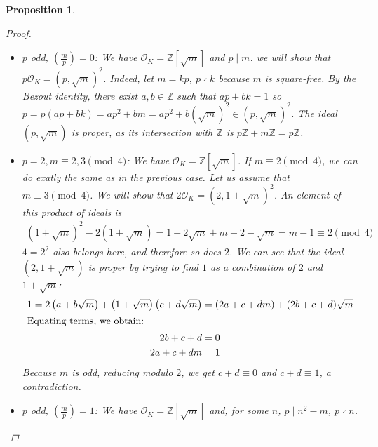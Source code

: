 \documentclass[11pt]{article}
\newtheorem{prop}{Proposition}
\theoremstyle{definition}
\begin{document}
\begin{prop}
\begin{proof}
            \begin{itemize}
                \item $p$ odd, $\left( \frac{m}{p} \right) = 0$: We have $\mathcal{O}_K = \mathbb{Z}\left[\sqrt {m}\right]$ and $p \mid m$.
                we will show that $p\mathcal{O}_K = \left(p, \sqrt {m}\right)^2$.
                Indeed, let $m = kp$, $p \nmid k$ because $m$ is square-free.
                By the Bezout identity, there exist $a, b \in \mathbb{Z}$ such that $ap + bk = 1$ so
                $p = p(ap+bk) = ap^2 + bm = ap^2 + b\left(\sqrt {m}\right)^2 \in \left(p, \sqrt {m}\right)^2$.
                The ideal $\left(p, \sqrt {m}\right)$ is proper,
                as its intersection with $\mathbb{Z}$ is $p\mathbb{Z} + m\mathbb{Z} = p\mathbb{Z}$.

                \item $p=2, m \equiv 2, 3 \pmod 4$:
                We have $\mathcal{O}_K = \mathbb{Z}\left[\sqrt {m}\right]$.
                If $m \equiv 2 \pmod 4$, we can do exatly the same as in the previous case.
                Let us assume that $m \equiv 3 \pmod 4$.
                We will show that $2\mathcal{O}_K = \left(2, 1 + \sqrt {m}\right)^2$.
                An element of this product of ideals is
                \begin{align}
                (1 + \sqrt {m})^2 - 2 (1+\sqrt {m}) = 1 + 2 \sqrt {m} + m - 2 - \sqrt {m} = m - 1 \equiv 2 \pmod 4 \nonumber
                \end{align}
                $4 = 2^2$ also belongs here, and therefore so does $2$.
                We can see that the ideal $(2, 1 + \sqrt {m})$ is proper by trying to find $1$ as a combination of $2$ and $1 + \sqrt {m}$:
                \begin{align*}
                    1 = 2\left(a + b\sqrt {m}\right) + \left(1 + \sqrt {m}\right) \left(c+d\sqrt {m}\right) &= (2a + c + dm) + (2b + c + d) \sqrt {m} \\
                    \intertext{Equating terms, we obtain:}
                    2b+c+d&=0 \\
                    2a+c+dm&=1
                \end{align*}
                Because $m$ is odd, reducing modulo $2$, we get $c+d \equiv 0$ and $c+d \equiv 1$, a contradiction.
                \item $p$ odd, $\left( \frac{m}{p} \right) = 1$:
                We have $\mathcal{O}_K = \mathbb{Z}\left[\sqrt {m}\right]$ and, for some $n$, $p \mid n^2 - m$, $p \nmid n$.

\end{itemize}
\end{proof}
\end{prop}
\end{document}
